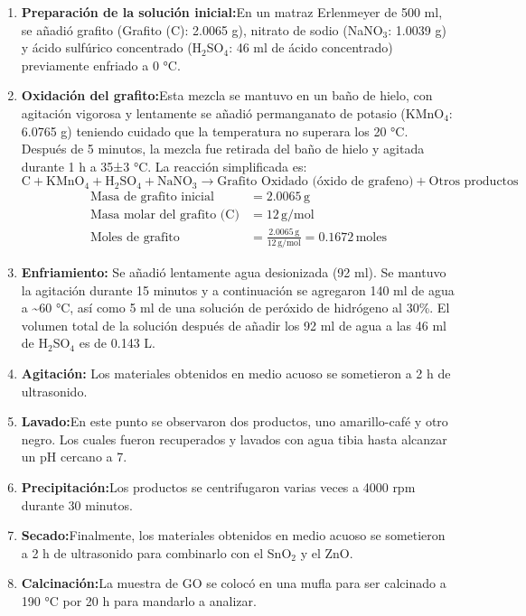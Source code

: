 \documentclass[12pt]{article}
\begin{document}
    \begin{enumerate}
    \item \textbf{Preparación de la solución inicial:}En un matraz Erlenmeyer de 500 ml, se añadió grafito (Grafito (C): 2.0065 g), nitrato de sodio (NaNO$_3$: 1.0039 g) y ácido sulfúrico concentrado (H$_2$SO$_4$: 46 ml de ácido concentrado) previamente enfriado a 0 °C. 

    \item\textbf{Oxidación del grafito:}Esta mezcla se mantuvo en un baño de hielo, con agitación vigorosa y lentamente se añadió permanganato de potasio (KMnO$_4$: 6.0765 g) teniendo cuidado que la temperatura no superara los 20 °C. Después de 5 minutos, la mezcla fue retirada del baño de hielo y agitada durante 1 h a 35±3 °C. La reacción simplificada es:
     \[
    \text{C} + \text{KMnO}_4 + \text{H}_2\text{SO}_4 + \text{NaNO}_3 \rightarrow \text{Grafito Oxidado (óxido de grafeno)} + \text{Otros productos}
    \]
    \begin{align}
    \text{Masa de grafito inicial} &= 2.0065 \, \text{g} \\
    \text{Masa molar del grafito (C)} &= 12 \, \text{g/mol} \\
    \text{Moles de grafito} &= \frac{2.0065 \, \text{g}}{12 \, \text{g/mol}} = 0.1672 \, \text{moles}
    \end{align}
    
    \item\textbf{Enfriamiento:} Se añadió lentamente agua desionizada (92 ml). Se mantuvo la agitación durante 15 minutos y a continuación se agregaron 140 ml de agua a \textasciitilde 60 °C, así como 5 ml de una solución de peróxido de hidrógeno al 30\%. El volumen total de la solución después de añadir los 92 ml de agua a las 46 ml de H$_2$SO$_4$ es de 0.143 L.
    
    \item\textbf{Agitación: } 
    Los materiales obtenidos en medio acuoso se sometieron a 2 h de ultrasonido.

    \item\textbf{Lavado:}En este punto se observaron dos productos, uno amarillo-café y otro negro. Los cuales fueron recuperados y lavados con agua tibia hasta alcanzar un pH cercano a 7.

    \item\textbf{Precipitación:}Los productos se centrifugaron varias veces a 4000 rpm durante 30 minutos.

    \item\textbf{Secado:}Finalmente, los materiales obtenidos en medio acuoso se sometieron a 2 h de ultrasonido para combinarlo con el SnO$\displaystyle _{2}$ y el ZnO.

    \item\textbf{Calcinación:}La muestra de GO se colocó en una mufla para ser calcinado a 190 °C por 20 h para mandarlo a analizar.
    
    \end{enumerate}
    
\end{document}
